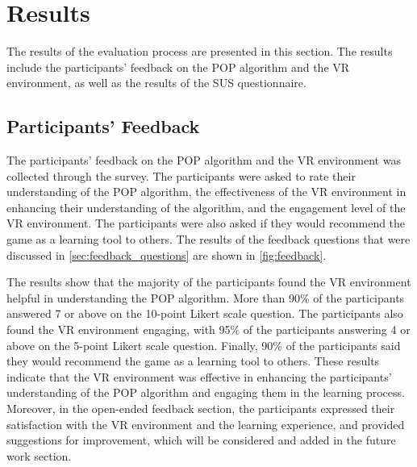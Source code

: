 \section{Results}

The results of the evaluation process are presented in this section. The results include the participants' feedback on the \ac{POP} algorithm and the \ac{VR} environment, as well as the results of the \ac{SUS} questionnaire.

\subsection{Participants' Feedback}

The participants' feedback on the \ac{POP} algorithm and the \ac{VR} environment was collected through the survey. The participants were asked to rate their understanding of the \ac{POP} algorithm, the effectiveness of the \ac{VR} environment in enhancing their understanding of the algorithm, and the engagement level of the \ac{VR} environment. The participants were also asked if they would recommend the game as a learning tool to others. The results of the feedback questions that were discussed in \autoref{sec:feedback_questions} are shown in \autoref{fig:feedback}.

The results show that the majority of the participants found the \ac{VR} environment helpful in understanding the \ac{POP} algorithm. More than 90\% of the participants answered 7 or above on the 10-point Likert scale question. The participants also found the \ac{VR} environment engaging, with 95\% of the participants answering 4 or above on the 5-point Likert scale question. Finally, 90\% of the participants said they would recommend the game as a learning tool to others. These results indicate that the \ac{VR} environment was effective in enhancing the participants' understanding of the \ac{POP} algorithm and engaging them in the learning process. Moreover, in the open-ended feedback section, the participants expressed their satisfaction with the \ac{VR} environment and the learning experience, and provided suggestions for improvement, which will be considered and added in the future work section.

